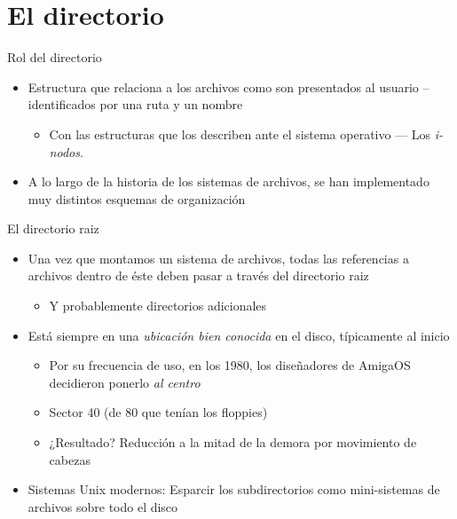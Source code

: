 \documentclass[presentation]{beamer}
\begin{document}
\section{El directorio}
\label{sec:org708602b}
\begin{frame}[label={sec:orga9a24fb}]{Rol del directorio}
\begin{itemize}
\item Estructura que relaciona a los archivos como son presentados al
usuario –identificados por una ruta y un nombre
\begin{itemize}
\item Con las estructuras que los describen ante el sistema operativo —
Los \emph{i-nodos}.
\end{itemize}
\item A lo largo de la historia de los sistemas de archivos, se han
implementado muy distintos esquemas de organización
\end{itemize}
\end{frame}

\begin{frame}[label={sec:org1d13caa}]{El directorio raiz}
\begin{itemize}
\item Una vez que montamos un sistema de archivos, todas las referencias
a archivos dentro de éste deben pasar a través del directorio raiz
\begin{itemize}
\item Y probablemente directorios adicionales
\end{itemize}
\item Está siempre en una \emph{ubicación bien conocida} en el disco,
típicamente al inicio
\begin{itemize}
\item Por su frecuencia de uso, en los 1980, los diseñadores de AmigaOS
decidieron ponerlo \emph{al centro}
\item Sector 40 (de 80 que tenían los floppies)
\item ¿Resultado? Reducción a la mitad de la demora por movimiento de cabezas
\end{itemize}
\item Sistemas Unix modernos: Esparcir los subdirectorios como
mini-sistemas de archivos sobre todo el disco
\end{itemize}
\end{frame}
\end{document}
